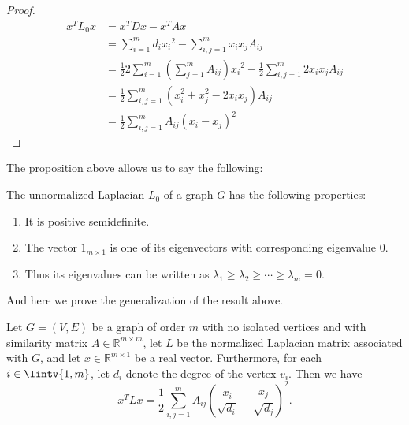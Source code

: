 \begin{proof}
   \begin{equation*} 
      \begin{split}
         x^TL_0x &= x^TDx - x^TAx \\
         &= \sum_{i=1}^m d_i{x_i}^2 - \sum_{i,j = 1}^m x_i  x_j A_{ij}  \\
         &= \frac{1}{2} 2 \sum_{i=1}^m \left( \sum_{j=1}^mA_{ij} \right){x_i}^2 - \frac{1}{2}\sum_{i,j = 1}^m 2x_i  x_j A_{ij}  \\
         &= \frac{1}{2} \sum_{i,j=1}^m (x_i^2 +x_j^2 - 2x_ix_j)A_{ij} \\
         &= \frac{1}{2} \sum_{i,j=1}^m A_{ij} \left( x_i - x_j \right) ^2
      \end{split}
   \end{equation*}
\end{proof}
   The proposition above allows us to say the following:
\begin{corollary}
   The unnormalized Laplacian $L_0$ of a graph $G$ has the following properties:
   \begin{enumerate}
      \item It is positive semidefinite.
      \item The vector $1_{m \times 1}$ is one of its eigenvectors with corresponding eigenvalue $0$.
      \item Thus its eigenvalues can be written as $\lambda_1 \ge \lambda_2 \ge \cdots \ge \lambda_m = 0$.
   \end{enumerate}
\end{corollary}

And here we prove the generalization of the result above.

\begin{proposition}\label{xtlx2}
   Let $G = (V,E)$ be a graph of order $m$ with no isolated vertices and with similarity matrix $A \in \mathbb R^{m \times m}$, let $L$ be the normalized Laplacian matrix associated with $G$, and let $x \in \mathbb R^{m \times 1}$ be a real vector. Furthermore, for each $i \in \Iintv{1,m}$, let $d_i$ denote the degree of the vertex $v_i$. Then we have
   \begin{equation}
      x^TLx = \frac{1}{2}\sum_{i,j = 1}^m A_{ij} \left( \frac{x_i}{\sqrt{d_i}} - \frac{x_j}{\sqrt{d_j}} \right)^2.
   \end{equation}
\end{proposition}


